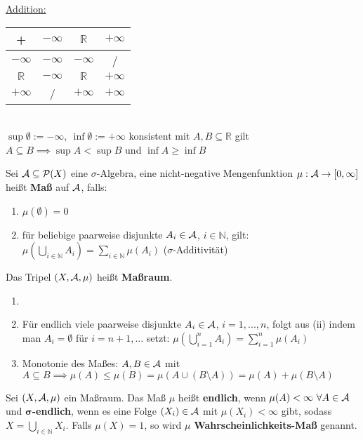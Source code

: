   \begin{notation}
    \underline{Addition:}
    \begin{tabular}[t]{c | c c c}
      + & $-\infty$ & $\mathbb{R}$ & $+\infty$\\
      \hline
      $-\infty$ & $-\infty$ & $-\infty$ & /\\
      $\mathbb{R}$ & $-\infty$ & $\mathbb{R}$ & $+\infty$\\
      $+\infty$ & / & $+\infty$ & $+\infty$
    \end{tabular}\\
    $\sup\emptyset := -\infty,\ \inf\emptyset := +\infty$ konsistent mit $A,B \subseteq \mathbb{R}$ gilt $A \subseteq B \implies \sup A < \sup B$ und $\inf A \geq \inf B$ 
  \end{notation}

  \begin{definition}
    Sei $\mathcal{A} \subseteq \mathcal{P}(X)$ eine $\sigma$-Algebra, eine nicht-negative Mengenfunktion $\mu: \mathcal{A} \rightarrow [0, \infty]$ heißt \textbf{Maß} auf $\mathcal{A}$, falls:
    \begin{enumerate}[label=(\roman*)]
      \item $\mu(\emptyset) = 0$
      \item für beliebige paarweise disjunkte $A_i \in \mathcal{A}$, $i \in \mathbb{N}$, gilt:\\
            $\mu(\bigcup\limits_{i \in \mathbb{N}} A_i) = \sum\limits_{i \in \mathbb{N}} \mu (A_i)$ \hfill ($\sigma$-Additivität)
    \end{enumerate}
    Das Tripel $(X, \mathcal{A}, \mu)$ heißt \textbf{Maßraum}.
  \end{definition}

  \begin{remark}
    \begin{enumerate}
      \item[]
      \item Für endlich viele paarweise disjunkte $A_i \in \mathcal{A}$, $i=1,...,n$, folgt aus (ii) indem man $A_i=\emptyset$ für $i=n+1, ...$ setzt: $\mu(\bigcup\limits_{i=1}^n A_i) = \sum\limits_{i=1}^n \mu(A_i)$
      \item Monotonie des Maßes: $A,B \in \mathcal{A}$ mit $A \subseteq B \implies \mu(A) \leq \mu(B) = \mu(A \cup (B \setminus A)) = \mu(A) + \mu(B \setminus A)$
    \end{enumerate}
  \end{remark}

  \begin{definition}
    Sei $(X, \mathcal{A}, \mu)$ ein Maßraum. Das Maß $\mu$ heißt \textbf{endlich}, wenn $\mu(A) < \infty\ \forall A \in \mathcal{A}$ und $\bm{\sigma}$\textbf{-endlich}, wenn es eine Folge $(X_i) \in \mathcal{A}$ mit $\mu(X_i) < \infty$ gibt, sodass $X=\bigcup\limits_{i \in \mathbb{N}} X_i$. Falls $\mu(X) = 1$, so wird $\mu$ \textbf{Wahrscheinlichkeits-Maß} genannt.
  \end{definition}


